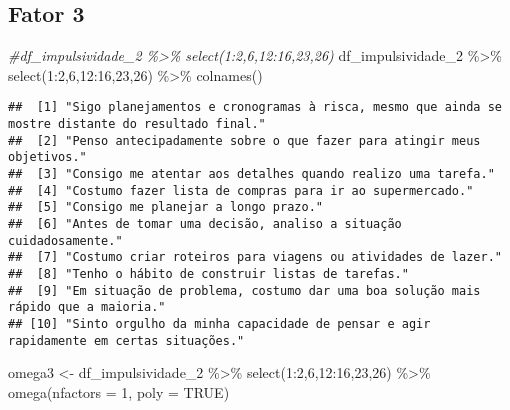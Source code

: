 \documentclass[
]{article}
\newenvironment{Shaded}{\begin{snugshade}}{\end{snugshade}}
\newcommand{\AttributeTok}[1]{\textcolor[rgb]{0.77,0.63,0.00}{#1}}
\newcommand{\CommentTok}[1]{\textcolor[rgb]{0.56,0.35,0.01}{\textit{#1}}}
\newcommand{\ConstantTok}[1]{\textcolor[rgb]{0.00,0.00,0.00}{#1}}
\newcommand{\DecValTok}[1]{\textcolor[rgb]{0.00,0.00,0.81}{#1}}
\newcommand{\FunctionTok}[1]{\textcolor[rgb]{0.00,0.00,0.00}{#1}}
\newcommand{\NormalTok}[1]{#1}
\newcommand{\OtherTok}[1]{\textcolor[rgb]{0.56,0.35,0.01}{#1}}
\newcommand{\SpecialCharTok}[1]{\textcolor[rgb]{0.00,0.00,0.00}{#1}}
\begin{document}
\hypertarget{fator-3}{%
\subsection{Fator 3}\label{fator-3}}

\begin{Shaded}
\begin{Highlighting}[]
\CommentTok{\#df\_impulsividade\_2 \%\textgreater{}\% select(1:2,6,12:16,23,26)}
\NormalTok{df\_impulsividade\_2 }\SpecialCharTok{\%\textgreater{}\%} \FunctionTok{select}\NormalTok{(}\DecValTok{1}\SpecialCharTok{:}\DecValTok{2}\NormalTok{,}\DecValTok{6}\NormalTok{,}\DecValTok{12}\SpecialCharTok{:}\DecValTok{16}\NormalTok{,}\DecValTok{23}\NormalTok{,}\DecValTok{26}\NormalTok{) }\SpecialCharTok{\%\textgreater{}\%} \FunctionTok{colnames}\NormalTok{()}
\end{Highlighting}
\end{Shaded}

\begin{verbatim}
##  [1] "Sigo planejamentos e cronogramas à risca, mesmo que ainda se mostre distante do resultado final."
##  [2] "Penso antecipadamente sobre o que fazer para atingir meus objetivos."                            
##  [3] "Consigo me atentar aos detalhes quando realizo uma tarefa."                                      
##  [4] "Costumo fazer lista de compras para ir ao supermercado."                                         
##  [5] "Consigo me planejar a longo prazo."                                                              
##  [6] "Antes de tomar uma decisão, analiso a situação cuidadosamente."                                  
##  [7] "Costumo criar roteiros para viagens ou atividades de lazer."                                     
##  [8] "Tenho o hábito de construir listas de tarefas."                                                  
##  [9] "Em situação de problema, costumo dar uma boa solução mais rápido que a maioria."                 
## [10] "Sinto orgulho da minha capacidade de pensar e agir rapidamente em certas situações."
\end{verbatim}

\begin{Shaded}
\begin{Highlighting}[]
\NormalTok{omega3 }\OtherTok{\textless{}{-}}\NormalTok{ df\_impulsividade\_2 }\SpecialCharTok{\%\textgreater{}\%} \FunctionTok{select}\NormalTok{(}\DecValTok{1}\SpecialCharTok{:}\DecValTok{2}\NormalTok{,}\DecValTok{6}\NormalTok{,}\DecValTok{12}\SpecialCharTok{:}\DecValTok{16}\NormalTok{,}\DecValTok{23}\NormalTok{,}\DecValTok{26}\NormalTok{) }\SpecialCharTok{\%\textgreater{}\%} \FunctionTok{omega}\NormalTok{(}\AttributeTok{nfactors =} \DecValTok{1}\NormalTok{, }\AttributeTok{poly =} \ConstantTok{TRUE}\NormalTok{)}
\end{Highlighting}
\end{Shaded}
\end{document}
